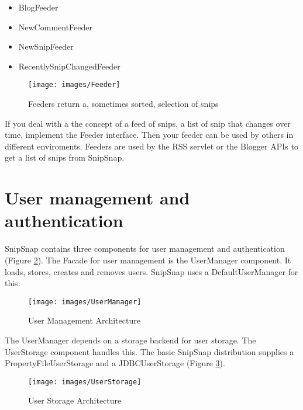 \documentclass[a4paper,pdftex]{article}
\begin{document}
\begin{itemize}
\item BlogFeeder
\item NewCommentFeeder
\item NewSnipFeeder
\item RecentlySnipChangedFeeder
\end{itemize}

\begin{figure}[ht]
  \centering
    \texttt{[image: images/Feeder]}
     \caption{\small\textsf Feeders return a, sometimes sorted, selection of snips}
     \label{Feeder}
\end{figure}

If you deal with a the concept of a feed of snips, a list of snip that changes over time, implement the
Feeder interface. Then your feeder can be used by others in different enviroments.
Feeders are used by the RSS servlet or the Blogger APIs to get a list of snips from SnipSnap.

\section{User management and authentication}

SnipSnap contains three components for user management and authentication (Figure \ref{UserManagement}).
The Facade for user management is the UserManager component. It loads, stores, creates and removes users.
SnipSnap uses a DefaultUserManager for this. 

\begin{figure}[ht]
  \centering
    \texttt{[image: images/UserManager]}
     \caption{\small\textsf User Management Architecture}
     \label{UserManagement}
\end{figure}

The UserManager depends on a storage backend for user storage.
The UserStorage component handles this. The basic SnipSnap  distribution supplies a PropertyFileUserStorage and a
JDBCUserStorage (Figure \ref{UserStorage}).

\begin{figure}[ht]
  \centering
    \texttt{[image: images/UserStorage]}
     \caption{\small\textsf User Storage Architecture}
     \label{UserStorage}
\end{figure}

\end{document}
